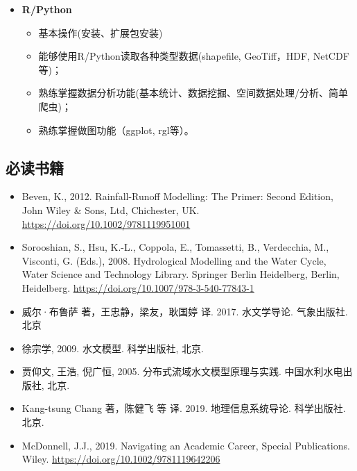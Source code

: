 \documentclass[
]{book}
\providecommand{\tightlist}{%
  \setlength{\itemsep}{0pt}\setlength{\parskip}{0pt}}
\begin{document}
\begin{itemize}
  \begin{itemize}
  \tightlist
  \item
    了解基本的气象要素的含义和观测方法；
  \item
    理解水和能量在气候/气象过程中的运动规律；
  \item
    熟练掌握气象和气候学的基础控制方程。
  \end{itemize}
\item
  \textbf{R/Python}

  \begin{itemize}
  \tightlist
  \item
    基本操作(安装、扩展包安装)
  \item
    能够使用R/Python读取各种类型数据(shapefile, GeoTiff，HDF, NetCDF等)；
  \item
    熟练掌握数据分析功能(基本统计、数据挖掘、空间数据处理/分析、简单爬虫)；
  \item
    熟练掌握做图功能（ggplot, rgl等）。
  \end{itemize}
\end{itemize}

\hypertarget{ux5fc5ux8bfbux4e66ux7c4d}{%
\subsection{必读书籍}\label{ux5fc5ux8bfbux4e66ux7c4d}}

\begin{itemize}
\tightlist
\item
  Beven, K., 2012. Rainfall-Runoff Modelling: The Primer: Second Edition, John Wiley \& Sons, Ltd, Chichester, UK. \url{https://doi.org/10.1002/9781119951001}
\item
  Sorooshian, S., Hsu, K.-L., Coppola, E., Tomassetti, B., Verdecchia, M., Visconti, G. (Eds.), 2008. Hydrological Modelling and the Water Cycle, Water Science and Technology Library. Springer Berlin Heidelberg, Berlin, Heidelberg. \url{https://doi.org/10.1007/978-3-540-77843-1}
\item
  威尔·布鲁萨 著，王忠静，梁友，耿国婷 译. 2017. 水文学导论. 气象出版社. 北京
\item
  徐宗学, 2009. 水文模型. 科学出版社, 北京.
\item
  贾仰文, 王浩, 倪广恒, 2005. 分布式流域水文模型原理与实践. 中国水利水电出版社, 北京.
\item
  Kang-tsung Chang 著，陈健飞 等 译. 2019. 地理信息系统导论. 科学出版社. 北京.
\item
  McDonnell, J.J., 2019. Navigating an Academic Career, Special Publications. Wiley. \url{https://doi.org/10.1002/9781119642206}
\end{itemize}
\end{document}
